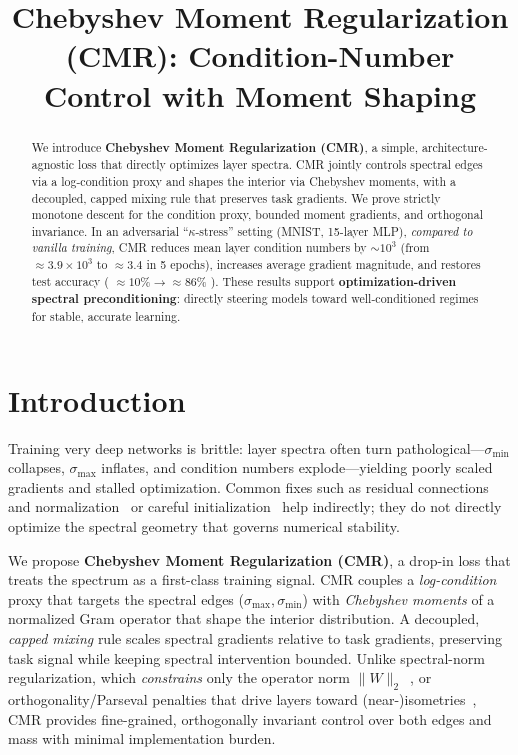 \documentclass{opt2025}
\title[Chebyshev Moment Regularization]{Chebyshev Moment Regularization (CMR): Condition-Number Control with Moment Shaping}
\newcommand{\cmr}{\textsc{CMR}\xspace}
\begin{document}
\maketitle

\begin{abstract}
We introduce \textbf{Chebyshev Moment Regularization (CMR)}, a simple, architecture-agnostic loss that directly optimizes layer spectra. CMR jointly controls spectral edges via a log-condition proxy and shapes the interior via Chebyshev moments, with a decoupled, capped mixing rule that preserves task gradients. We prove strictly monotone descent for the condition proxy, bounded moment gradients, and orthogonal invariance. In an adversarial ``$\kappa$-stress'' setting (MNIST, 15-layer MLP), \emph{compared to vanilla training}, CMR reduces mean layer condition numbers by $\sim\!10^3$ (from $\approx3.9\!\times\!10^3$ to $\approx3.4$ in 5 epochs), increases average gradient magnitude, and restores test accuracy ( $\approx10\%\!\to\!\approx86\%$ ). These results support \textbf{optimization-driven spectral preconditioning}: directly steering models toward well-conditioned regimes for stable, accurate learning.
\end{abstract}

\section{Introduction}
Training very deep networks is brittle: layer spectra often turn pathological—$\sigma_{\min}$ collapses, $\sigma_{\max}$ inflates, and condition numbers explode—yielding poorly scaled gradients and stalled optimization. Common fixes such as residual connections and normalization~\citep{He2016deep,Ioffe2015batch} or careful initialization~\citep{Glorot2010understanding} help indirectly; they do not directly optimize the spectral geometry that governs numerical stability.

\noindent We propose \textbf{Chebyshev Moment Regularization (\cmr)}, a drop-in loss that treats the spectrum as a first-class training signal. \cmr couples a \emph{log-condition} proxy that targets the spectral edges ($\sigma_{\max},\sigma_{\min}$) with \emph{Chebyshev moments} of a normalized Gram operator that shape the interior distribution. A decoupled, \emph{capped mixing} rule scales spectral gradients relative to task gradients, preserving task signal while keeping spectral intervention bounded. Unlike spectral-norm regularization, which \emph{constrains} only the operator norm $\|W\|_2$~\citep{Miyato2018spectral}, or orthogonality/Parseval penalties that drive layers toward (near-)isometries~\citep{Cisse2017parseval}, \cmr provides fine-grained, orthogonally invariant control over both edges and mass with minimal implementation burden.
\end{document}
